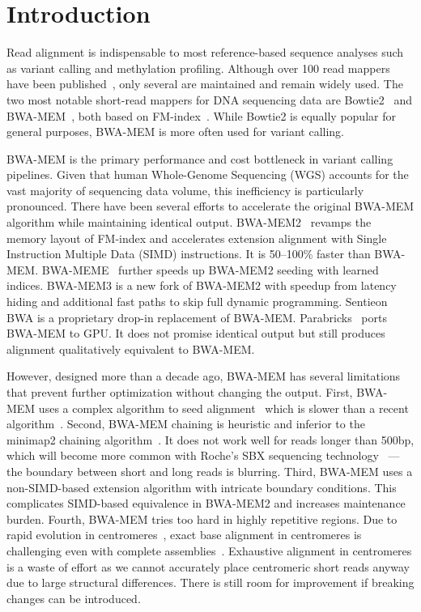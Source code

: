 \documentclass[webpdf,contemporary,large,namedate]{oup-authoring-template}%
\begin{document}
\section{Introduction}

Read alignment is indispensable to most reference-based sequence analyses such as variant calling and methylation profiling.
Although over 100 read mappers have been published~\citep{Alser:2021aa,DBLP:journals/csur/ProusalisGKNKAPSG26},
only several are maintained and remain widely used.
The two most notable short-read mappers for DNA sequencing data are Bowtie2~\citep{Langmead:2012fk} and BWA-MEM~\citep{Li:2013aa}, both based on FM-index~\citep{DBLP:conf/focs/FerraginaM00}.
While Bowtie2 is equally popular for general purposes, BWA-MEM is more often used for variant calling.

BWA-MEM is the primary performance and cost bottleneck in variant calling pipelines.
Given that human Whole-Genome Sequencing (WGS) accounts for the vast majority of sequencing data volume, this inefficiency is particularly pronounced.
There have been several efforts to accelerate the original BWA-MEM algorithm while maintaining identical output.
BWA-MEM2~\citep{DBLP:conf/ipps/VasimuddinMLA19} revamps the memory layout of FM-index
and accelerates extension alignment with Single Instruction Multiple Data (SIMD) instructions.
It is 50--100\% faster than BWA-MEM.
BWA-MEME~\citep{Jung:2022aa} further speeds up BWA-MEM2 seeding with learned indices.
BWA-MEM3 is a new fork of BWA-MEM2 with speedup from latency hiding and additional fast paths to skip full dynamic programming.
Sentieon BWA is a proprietary drop-in replacement of BWA-MEM.
Parabricks~\citep{OConnell:2023aa,Zhu2025.07.23.666378} ports BWA-MEM to GPU.
It does not promise identical output but still produces alignment qualitatively equivalent to BWA-MEM.

However, designed more than a decade ago, BWA-MEM has several limitations that prevent further optimization without changing the output.
First, BWA-MEM uses a complex algorithm to seed alignment~\citep{Li:2012fk} which is slower than a recent algorithm~\citep{DBLP:conf/dlt/Gagie24,Li:2024ac}.
Second, BWA-MEM chaining is heuristic and inferior to the minimap2 chaining algorithm~\citep{Li:2018ab}.
It does not work well for reads longer than 500bp, which will become more common with Roche's SBX sequencing technology~\citep{Kokoris2025.02.19.639056} ---
the boundary between short and long reads is blurring.
Third, BWA-MEM uses a non-SIMD-based extension algorithm with intricate boundary conditions.
This complicates SIMD-based equivalence in BWA-MEM2 and increases maintenance burden.
Fourth, BWA-MEM tries too hard in highly repetitive regions.
Due to rapid evolution in centromeres~\citep{Gao2025.12.09.693231}, 
exact base alignment in centromeres is challenging even with complete assemblies~\citep{Bzikadze:2022aa}.
Exhaustive alignment in centromeres is a waste of effort
as we cannot accurately place centromeric short reads anyway due to large structural differences.
There is still room for improvement if breaking changes can be introduced.
\end{document}
